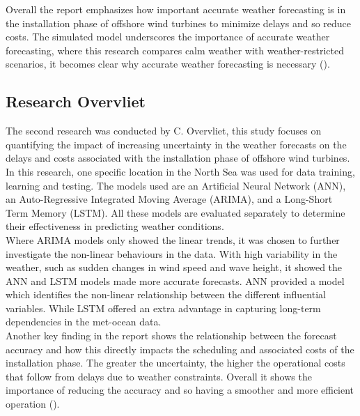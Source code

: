\noindent Overall the report emphasizes how important accurate weather forecasting is in the installation phase of offshore wind turbines to minimize delays and so reduce costs. The simulated model underscores the importance of accurate weather forecasting, where this research compares calm weather with weather-restricted scenarios, it becomes clear why accurate weather forecasting is necessary (\cite{boer2022installation}).

\subsection{Research Overvliet}
The second research was conducted by C. Overvliet, this study focuses on quantifying the impact of increasing uncertainty in the weather forecasts on the delays and costs associated with the installation phase of offshore wind turbines. In this research, one specific location in the North Sea was used for data training, learning and testing. The models used are an Artificial Neural Network (ANN), an Auto-Regressive Integrated Moving Average (ARIMA), and a Long-Short Term Memory (LSTM). All these models are evaluated separately to determine their effectiveness in predicting weather conditions. 
\\

\noindent Where ARIMA models only showed the linear trends, it was chosen to further investigate the non-linear behaviours in the data. With high variability in the weather, such as sudden changes in wind speed and wave height, it showed the ANN and LSTM models made more accurate forecasts. ANN provided a model which identifies the non-linear relationship between the different influential variables. While LSTM offered an extra advantage in capturing long-term dependencies in the met-ocean data. 
\\

\noindent Another key finding in the report shows the relationship between the forecast accuracy and how this directly impacts the scheduling and associated costs of the installation phase. The greater the uncertainty, the higher the operational costs that follow from delays due to weather constraints. Overall it shows the importance of reducing the accuracy and so having a smoother and more efficient operation (\cite{overvliet2023uncertainty}).